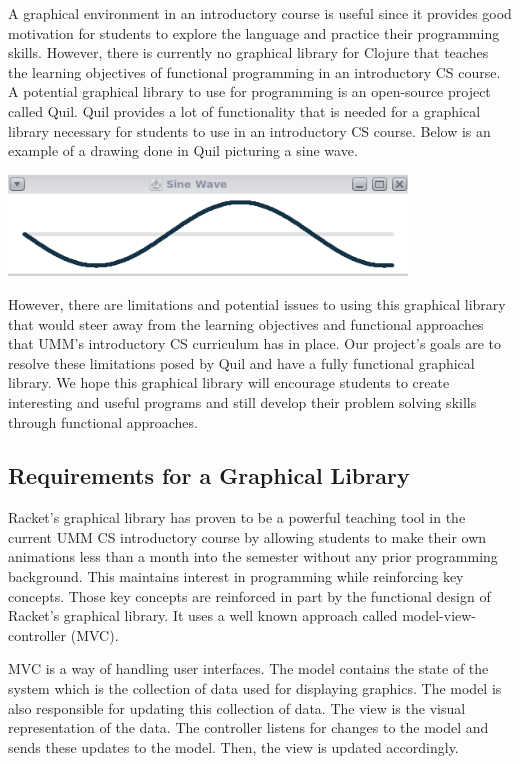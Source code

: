 \documentclass[12pt]{article}
\newcommand{\comment}[1]{{\bf \tt  {#1}}}
\newcommand{\todo}[1]{\textcolor{blue}{\comment{To Do: {#1}}}}
\begin{document}
A graphical environment in an introductory course is useful since it provides good motivation for students to explore the language and practice their programming skills. However, there is currently no graphical library for Clojure that teaches the learning objectives of functional programming in an introductory CS course. A potential graphical library to use for programming is an open-source project called Quil. Quil provides a lot of functionality that is needed for a graphical library necessary for students to use in an introductory CS course. Below is an example of a drawing done in Quil picturing a sine wave.

\begin{center}
\includegraphics[width=300pt]{sine-wave}
\end{center}

However, there are limitations and potential issues to using this graphical library that would steer away from the learning objectives and functional approaches that UMM's introductory CS curriculum has in place. Our project's goals are to resolve these limitations posed by Quil and have a fully functional graphical library. We hope this graphical library will encourage students to create interesting and useful programs and still develop their problem solving skills through functional approaches.


\subsection{Requirements for a Graphical Library}\label{subsec:requirements}
Racket's graphical library has proven to be a powerful teaching tool in the current UMM CS introductory course by allowing students to make their own animations less than a month into the semester without any prior programming background. This maintains interest in programming while reinforcing key concepts. Those key concepts are reinforced in part by the functional design of Racket's graphical library. It uses a well known approach called model-view-controller (MVC).

MVC is a way of handling user interfaces. The model contains the state of the system which is the collection of data used for displaying graphics. The model is also responsible for updating this collection of data. The view is the visual representation of the data. %
The controller listens for changes to the model and sends these updates to the model. Then, the view is updated accordingly.
\end{document}

